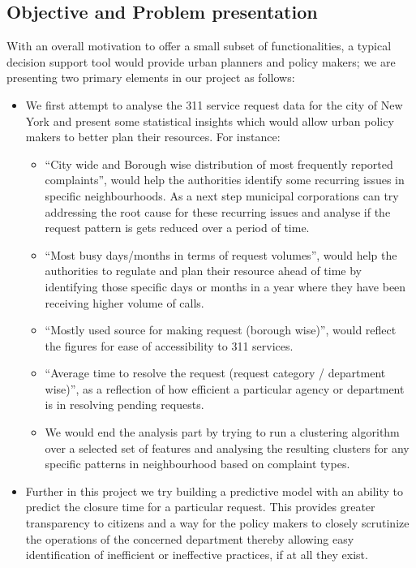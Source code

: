 \documentclass[10pt,twocolumn,letterpaper]{article}
\begin{document}
\subsection{Objective and Problem presentation}
With an overall motivation to offer a small subset of functionalities, a typical decision support tool would provide urban planners and policy makers; we are presenting two primary elements in our project as follows:
\begin{itemize}
\item We first attempt to analyse the 311 service request data for the city of New York and present some statistical insights which would allow urban policy makers to better plan their resources. For instance: 
\begin{itemize}
\item “City wide and Borough wise distribution of most frequently reported complaints”, would help the authorities identify some recurring issues in specific neighbourhoods. As a next step municipal corporations can try addressing the root cause for these recurring issues and analyse if the request pattern is gets reduced over a period of time.   
\item “Most busy days/months in terms of request volumes”, would help the authorities to regulate and plan their resource ahead of time by identifying those specific days or months in a year where they have been receiving higher volume of calls. 
\item “Mostly used source for making request (borough wise)”, would reflect the figures for ease of accessibility to 311 services.   
\item “Average time to resolve the request (request category / department wise)”, as a reflection of how efficient a particular agency or department is in resolving pending requests.  
\item We would end the analysis part by trying to run a clustering algorithm over a selected set of features and analysing the resulting clusters for any specific patterns in neighbourhood based on complaint types.
\end{itemize}
\item Further in this project we try building a predictive model with an ability to predict the closure time for a particular request. This provides greater transparency to citizens and a way for the policy makers to closely scrutinize the operations of the concerned department thereby allowing easy identification of inefficient or ineffective practices, if at all they exist.
\end{itemize}
\end{document}
